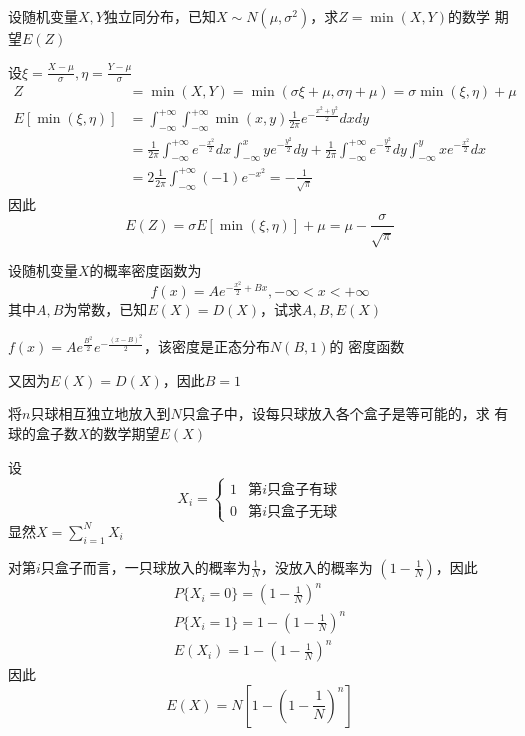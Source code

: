 \documentclass{article}
\begin{document}
\begin{examplle}[]
设随机变量\(X,Y\)独立同分布，已知\(X\sim N(\mu,\sigma^2)\)，求\(Z=\min(X,Y)\)的数学
期望\(E(Z)\)

设\(\xi=\frac{X-\mu}{\sigma},\eta=\frac{Y-\mu}{\sigma}\)
\begin{align*}
Z&=\min(X,Y)=\min(\sigma\xi+\mu,\sigma\eta+\mu)=\sigma\min(\xi,\eta)+\mu\\
E[\min(\xi,\eta)]&=
\int_{-\infty}^{+\infty}\int_{-\infty}^{+\infty}\min(x,y)\frac{1}{2\pi}e^{-\frac{x^2+y^2}{2}}dxdy\\
&=\frac{1}{2\pi}\int_{-\infty}^{+\infty}e^{-\frac{x^2}{2}}dx\int_{-\infty}^xye^{-\frac{y^2}{2}}dy+
\frac{1}{2\pi}\int_{-\infty}^{+\infty}e^{-\frac{y^2}{2}}dy
\int_{-\infty}^yxe^{-\frac{x^2}{2}}dx\\
&=2\frac{1}{2\pi}\int_{-\infty}^{+\infty}(-1)e^{-x^2}=-\frac{1}{\sqrt{\pi}}
\end{align*}
因此
\begin{equation*}
E(Z)=\sigma E[\min(\xi,\eta)]+\mu=\mu-\frac{\sigma}{\sqrt{\pi}}
\end{equation*}
\end{examplle}

\begin{examplle}[]
设随机变量\(X\)的概率密度函数为
\begin{equation*}
f(x)=Ae^{-\frac{x^2}{2}+Bx},-\infty<x<+\infty
\end{equation*}
其中\(A,B\)为常数，已知\(E(X)=D(X)\)，试求\(A,B,E(X)\)

\(f(x)=Ae^{\frac{B^2}{2}}e^{-\frac{(x-B)^2}{2}}\)，该密度是正态分布\(N(B,1)\)的
密度函数

又因为\(E(X)=D(X)\)，因此\(B=1\)
\end{examplle}

\begin{examplle}[]
将\(n\)只球相互独立地放入到\(N\)只盒子中，设每只球放入各个盒子是等可能的，求
有球的盒子数\(X\)的数学期望\(E(X)\)

设
\begin{equation*}
X_i=
\begin{cases}
1&\text{第$i$只盒子有球}\\
0&\text{第$i$只盒子无球}
\end{cases}
\end{equation*}
显然\(X=\sum_{i=1}^NX_i\)

对第\(i\)只盒子而言，一只球放入的概率为\(\frac{1}{N}\)，没放入的概率为
\((1-\frac{1}{N})\)，因此
\begin{gather*}
P\{X_i=0\}=\left(1-\frac{1}{N}\right)^n\\
P\{X_i=1\}=1-\left(1-\frac{1}{N}\right)^n\\
E(X_i)=1-\left(1-\frac{1}{N}\right)^n
\end{gather*}
因此
\begin{equation*}
E(X)=N\left[1-\left(1-\frac{1}{N}\right)^n\right]
\end{equation*}
\end{examplle}
\end{document}
